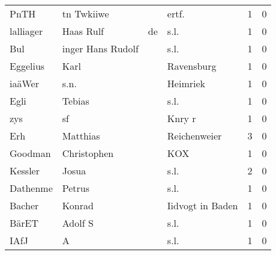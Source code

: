 \documentclass[10pt,a4paper,landscape]{article}
\begin{document}
\begin{longtable}{llllrr}
                     PnTH &                         tn Twkiiwe &             &                                      ertf.  &          1 &         0 \\
                lalliager &                          Haas Rulf &          de &                                        s.l. &          1 &         0 \\
                      Bul &                  inger Hans Rudolf &             &                                        s.l. &          1 &         0 \\
                 Eggelius &                               Karl &             &                                  Ravensburg &          1 &         0 \\
                   iaäWer &                               s.n. &             &                                    Heimriek &          1 &         0 \\
                     Egli &                             Tebias &             &                                        s.l. &          1 &         0 \\
                      zys &                                 sf &             &                                      Knry r &          1 &         0 \\
                      Erh &                           Matthias &             &                                Reichenweier &          3 &         0 \\
                  Goodman &                        Christophen &             &                                         KOX &          1 &         0 \\
                  Kessler &                              Josua &             &                                        s.l. &          2 &         0 \\
                 Dathenme &                             Petrus &             &                                        s.l. &          1 &         0 \\
                   Bacher &                             Konrad &             &                            Iidvogt in Baden &          1 &         0 \\
                    BärET &                            Adolf S &             &                                        s.l. &          1 &         0 \\
                     IAfJ &                                  A &             &                                        s.l. &          1 &         0 \\

\end{longtable}
\end{document}

